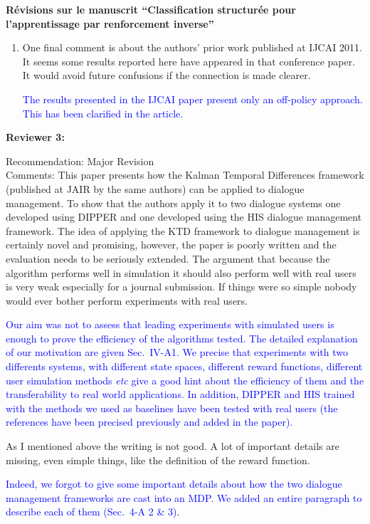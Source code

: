 \documentclass[11pt, a4paper]{letter}
\begin{document}
\begin{letter}{\large \textbf{Révisions sur le manuscrit ``Classification structurée pour l'apprentissage par renforcement inverse''}}
\begin{enumerate}
\item  One final comment is about the authors' prior work published at IJCAI 2011.
 It seems some results reported here have appeared in that conference
 paper.  It would avoid future confusions if the connection is made clearer.

\textcolor{blue}{The results presented in the IJCAI paper present
only an off-policy approach. This has been clarified in the
article.}

\end{enumerate}

\vspace{.5cm}
\newpage
\begin{large} \textbf{Reviewer 3:} \\ \end{large}
 Recommendation: Major Revision\\
 Comments: This paper presents how the Kalman Temporal Differences framework
 (published at JAIR by the same authors) can be applied to dialogue
 management. To show that the authors apply it to two dialogue systems one
 developed using DIPPER and one developed using the HIS dialogue management
 framework. The idea of applying the KTD framework to dialogue management is
 certainly novel and promising, however, the paper is poorly written and the
 evaluation needs to be seriously extended. The argument that because
 the algorithm performs well in simulation it should also perform well with
 real users is very weak especially for a journal submission. If things were
 so simple nobody would ever bother perform experiments with real users.

\textcolor{blue}{Our aim was not to assess that leading experiments
with simulated users is enough to prove the efficiency of the
algorithms tested. The detailed explanation of our motivation are
given Sec.~IV-A1. We precise that experiments with two differents
systems, with different state spaces, different reward functions,
different user simulation methods \textit{etc} give a good hint
about the efficiency of them and the transferability to real world
applications. In addition, DIPPER and HIS trained with the methods
we used as baselines have been tested with real users (the
references have been precised previously and added in the paper).}

 As I mentioned above the writing is not good. A lot of important details
 are missing, even simple things, like the definition of the reward
 function.

\textcolor{blue}{Indeed, we forgot to give some important details
about how the two dialogue management frameworks are cast into an
MDP. We added an entire paragraph to describe each of them (Sec.~4-A
2 \& 3). }


\end{letter}
\end{document}
